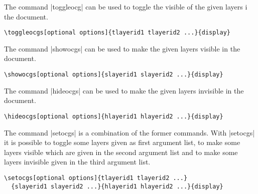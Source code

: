 \documentclass[a4paper]{ltxdoc}
\begin{document}
The command |toggleocg| can be used to toggle the visible of the given layers i the document.
\begin{verbatim}
\toggleocgs[optional options]{tlayerid1 tlayerid2 ...}{display}
 \end{verbatim}

The command |showocgs| can be used to make the given layers visible in the document.
\begin{verbatim}
\showocgs[optional options]{slayerid1 slayerid2 ...}{display}
 \end{verbatim}

The command |hideocgs| can be used to make the given layers invisible in the document.
\begin{verbatim}
\hideocgs[optional options]{hlayerid1 hlayerid2 ...}{display}
 \end{verbatim}

The command |setocgs| is a combination of the former commands. With |setocgs| it is possible to toggle some layers given as first argument list, to make some layers visible which are given in the second argument list and to make some layers invisible given in the third argument list.

\begin{verbatim}
\setocgs[optional options]{tlayerid1 tlayerid2 ...}
  {slayerid1 slayerid2 ...}{hlayerid1 hlayerid2 ...}{display}
 \end{verbatim}
\end{document}
